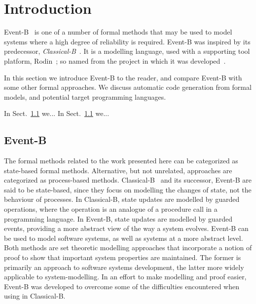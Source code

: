 \section{Introduction}
Event-B~\cite{ABR10} is one of a number of formal methods that may be used to model systems where a high degree of reliability is required. Event-B was inspired by its predecessor, \emph{Classical-B}~\cite{TheBBook}. It is a modelling language, used with a supporting tool platform, Rodin~\cite{abrial10rodin}; so named from the project in which it was developed~\cite{RodinTool}.  

In this section we introduce Event-B to the reader, and compare Event-B with some other formal approaches. We discuss automatic code generation from formal models, and potential target programming languages.

In Sect.~\ref{} we...
In Sect.~\ref{} we...

\subsection{Event-B}
The formal methods related to the work presented here can be categorized as state-based formal methods. Alternative, but not unrelated, approaches are categorized as process-based methods. Classical-B~\cite{TheBBook,CNP,CNPInterface,B4Free} and its successor, Event-B are said to be state-based, since they focus on modelling the changes of state, not the behaviour of processes. In Classical-B, state updates are modelled by guarded operations, where the operation is an analogue of a procedure call in a programming language. In Event-B, state updates are modelled by guarded events, providing a more abstract view of the way a system evolves. Event-B can be used to model software systems, as well as systems at a more abstract level. Both methods are set theoretic modelling approaches that incorporate a notion of proof to show that important system properties are maintained. The former is primarily an approach to software systems development, the latter more widely applicable to system-modelling. In an effort to make modelling and proof easier, Event-B was developed to overcome some of the difficulties encountered when using in Classical-B. 

